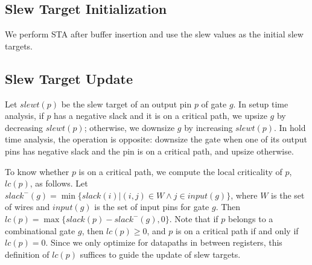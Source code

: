 

\subsection{Slew Target Initialization}
We perform STA after buffer insertion and use the slew values as the initial slew targets.

\subsection{Slew Target Update}

Let $slewt(p)$ be the slew target of an output pin $p$ of gate $g$. In setup time analysis, if $p$ has a negative slack and it is on a critical path, we upsize $g$ by decreasing $slewt(p)$; otherwise, we downsize $g$ by increasing $slewt(p)$. In hold time analysis, the operation is opposite: downsize the gate when one of its output pins has negative slack and the pin is on a critical path, and upsize otherwise.

To know whether $p$ is on a critical path, we compute the local criticality of $p$, $lc(p)$, as follows. Let $slack^{-}(g) = \min\{slack(i) | (i, j) \in W \land j \in input(g)\}$, where $W$ is the set of wires and $input(g)$ is the set of input pins for gate $g$. Then $lc(p) = \max\{slack(p) - slack^{-}(g), 0\}$. Note that if $p$ belongs to a combinational gate $g$, then $lc(p) \geq 0$, and $p$ is on a critical path if and only if $lc(p) = 0$. Since we only optimize for datapaths in between registers, this definition of $lc(p)$ suffices to guide the update of slew targets.

